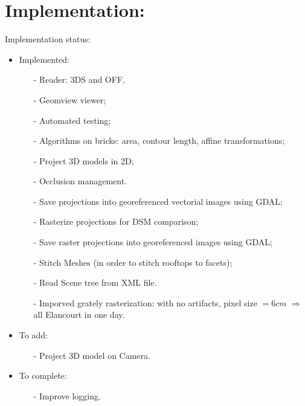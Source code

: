 \documentclass[a4paper, 11pt]{article}
\begin{document}
	\section*{Implementation:}
	Implementation status:
	\begin{itemize}
		\item Implemented:
			\begin{itemize}
				\item[-] Reader: 3DS and OFF,
				\item[-] Geomview viewer;
				\item[-] Automated testing;
				\item[-] Algorithms on bricks: area, contour length, affine transformations;
				\item[-] Project 3D models in 2D;
				\item[-] Occlusion management.
				\item[-] Save projections into georeferenced vectorial images using GDAL;
				\item[-] Rasterize projections for DSM comparison;
				\item[-] Save raster projections into georeferenced images using GDAL;
				\item[-] Stitch Meshes (in order to stitch rooftops to facets);
				\item[-] Read Scene tree from XML file.
				\item[-] Imporved grately rasterization: with no artifacts, pixel size $= 6 cm $ $\Rightarrow$ all  Elancourt in one day.
			\end{itemize}
		\item To add:
			\begin{itemize}
				\item[-] Project 3D model on Camera.
		\end{itemize}
		\item To complete:
			\begin{itemize}
				\item[-] Improve logging.
			\end{itemize}
	\end{itemize}
	
\end{document}
